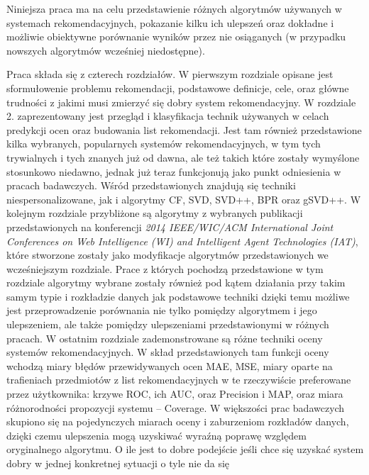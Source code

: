 \documentclass{pracamgr}
\begin{document}
  Niniejsza praca ma na celu przedstawienie różnych algorytmów używanych w systemach rekomendacyjnych, pokazanie kilku ich ulepszeń oraz
  dokładne i możliwie obiektywne porównanie wyników przez nie osiąganych (w przypadku nowszych algorytmów wcześniej niedostępne).\newline
 
  Praca składa się z czterech rozdziałów. W pierwszym rozdziale opisane jest sformułowenie problemu rekomendacji,
  podstawowe definicje, cele, oraz główne trudności z jakimi musi zmierzyć się dobry system rekomendacyjny.
  W rozdziale 2. zaprezentowany jest przegląd i klasyfikacja technik używanych w celach predykcji ocen oraz budowania list rekomendacji.\newline
  Jest tam również przedstawione kilka wybranych, popularnych systemów rekomendacyjnych, w tym tych trywialnych
  i tych znanych już od dawna, ale też takich które zostały wymyślone stosunkowo niedawno, jednak już teraz funkcjonują
  jako punkt odniesienia w pracach badawczych. Wśród przedstawionych znajdują się techniki niespersonalizowane, jak i algorytmy CF, SVD, SVD++,
  BPR oraz gSVD++.\newline
  W kolejnym rozdziale przybliżone są algorytmy z wybranych publikacji przedstawionych na konferencji
  \textit{2014 IEEE/WIC/ACM International Joint Conferences on Web Intelligence (WI) and Intelligent Agent Technologies (IAT)}, 
  które stworzone zostały jako modyfikacje algorytmów przedstawionych we wcześniejszym rozdziale. Prace z których pochodzą
  przedstawione w tym rozdziale algorytmy wybrane zostały również pod kątem działania przy takim samym typie i rozkładzie danych jak podstawowe techniki
  dzięki temu możliwe jest przeprowadzenie porównania nie tylko pomiędzy algorytmem i jego ulepszeniem, ale także pomiędzy ulepszeniami
  przedstawionymi w różnych pracach.\newline
  W ostatnim rozdziale zademonstrowane są różne techniki oceny systemów rekomendacyjnych.
  W skład przedstawionych tam funkcji oceny wchodzą miary błędów przewidywanych ocen MAE, MSE,
  miary oparte na trafieniach przedmiotów z list rekomendacyjnych w te rzeczywiście preferowane przez użytkownika:
  krzywe ROC, ich AUC, oraz Precision i MAP, oraz miara różnorodności propozycji systemu -- Coverage.
  W większości prac badawczych skupiono się na pojedynczych miarach oceny i zaburzeniom rozkładów danych,
  dzięki czemu ulepszenia mogą uzyskiwać wyraźną poprawę względem oryginalnego algorytmu.
  O ile jest to dobre podejście jeśli chce się uzyskać system dobry w jednej konkretnej sytuacji o tyle nie da się
\end{document}
